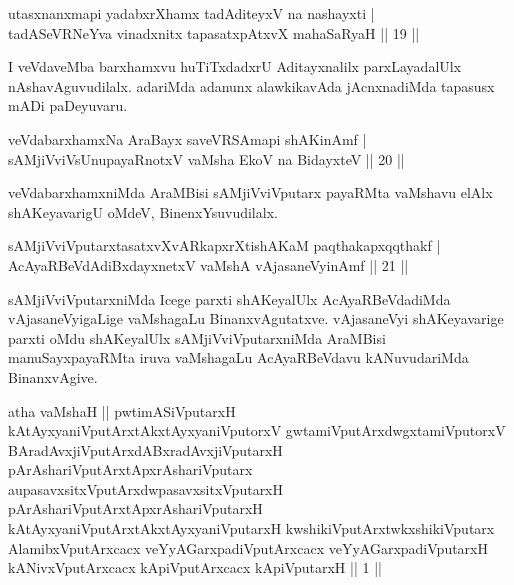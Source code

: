 \begin{shl}
utasxnanxmapi yadabxrXhamx tadAditeyxV na nashayxti | \\
tadASeVRNeYva vinadxnitx tapasatxpAtxvX mahaSaRyaH \hfill||  19 ||  
\end{shl}

\begin{artha}
I veVdaveMba barxhamxvu huTiTxdadxrU Aditayxnalilx parxLayadalUlx 
nAshavAguvudilalx. adariMda adanunx alawkikavAda jAcnxnadiMda tapasusx 
mADi paDeyuvaru.
\end{artha}

\begin{shl}
veVdabarxhamxNa AraBayx saveVRSAmapi shAKinAmf | \\
sAMjiVviVsUnupayaRnotxV vaMsha EkoV na BidayxteV \hfill||  20 ||  
\end{shl}

\begin{artha}
veVdabarxhamxniMda AraMBisi sAMjiVviVputarx payaRMta vaMshavu elAlx 
shAKeyavarigU oMdeV, BinenxYsuvudilalx.
\end{artha}

\begin{shl}
sAMjiVviVputarxtasatxvXvARkapxrXtishAKaM paqthakapxqqthakf | \\
AcAyaRBeVdAdiBxdayxnetxV vaMshA vAjasaneVyinAmf \hfill||  21 ||  
\end{shl}

\begin{artha}
sAMjiVviVputarxniMda Icege parxti shAKeyalUlx AcAyaRBeVdadiMda 
vAjasaneVyigaLige vaMshagaLu BinanxvAgutatxve. vAjasaneVyi 
shAKeyavarige parxti oMdu shAKeyalUlx sAMjiVviVputarxniMda 
AraMBisi manuSayxpayaRMta iruva vaMshagaLu AcAyaRBeVdavu 
kANuvudariMda BinanxvAgive.
\end{artha}



\begin{kandikeshl}
atha vaMshaH || pwtimASiVputarxH kAtAyxyaniVputArxtAkxtAyxyaniVputorxV gwtamiVputArxdwgxtamiVputorxV BAradAvxjiVputArxdABxradAvxjiVputarxH pArAshariVputArxtApxrAshariVputarx aupasavxsitxVputArxdwpasavxsitxVputarxH pArAshariVputArxtApxrAshariVputarxH kAtAyxyaniVputArxtAkxtAyxyaniVputarxH kwshikiVputArxtwkxshikiVputarx AlamibxVputArxcacx veYyAGarxpadiVputArxcacx veYyAGarxpadiVputarxH kANivxVputArxcacx kApiVputArxcacx kApiVputarxH || 1 || 
\end{kandikeshl}

